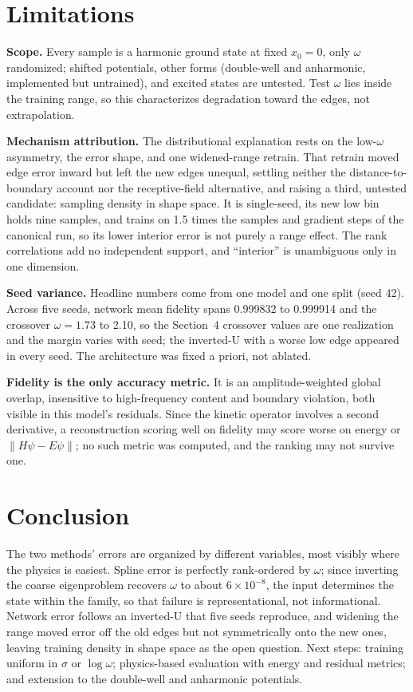 \documentclass{article}
\begin{document}
\section{Limitations}

\textbf{Scope.} Every sample is a harmonic ground state at fixed $x_{0} = 0$,
only $\omega$ randomized; shifted potentials, other forms (double-well and
anharmonic, implemented but untrained), and excited states are untested. Test
$\omega$ lies inside the training range, so this characterizes degradation
toward the edges, not extrapolation.

\textbf{Mechanism attribution.} The distributional explanation rests on the
low-$\omega$ asymmetry, the error shape, and one widened-range retrain. That
retrain moved edge error inward but left the new edges unequal, settling neither
the distance-to-boundary account nor the receptive-field alternative, and raising
a third, untested candidate: sampling density in shape space. It is
single-seed, its new low bin holds nine samples, and trains on 1.5 times the
samples and gradient steps of the canonical run, so its lower interior error is
not purely a range effect. The rank correlations add no independent support, and
``interior'' is unambiguous only in one dimension.

\textbf{Seed variance.} Headline numbers come from one model and one split (seed
42). Across five seeds, network mean fidelity spans 0.999832 to 0.999914 and the
crossover $\omega = 1.73$ to 2.10, so the Section~4 crossover values are one
realization and the margin varies with seed; the inverted-U with a worse low edge
appeared in every seed. The architecture was fixed a priori, not ablated.

\textbf{Fidelity is the only accuracy metric.} It is an amplitude-weighted global
overlap, insensitive to high-frequency content and boundary violation, both
visible in this model's residuals. Since the kinetic operator involves a second
derivative, a reconstruction scoring well on fidelity may score worse on energy
or $\lVert H\psi - E\psi \rVert$; no such metric was computed, and the ranking
may not survive one.

\section{Conclusion}

The two methods' errors are organized by different variables, most visibly where
the physics is easiest. Spline error is perfectly rank-ordered by $\omega$; since
inverting the coarse eigenproblem recovers $\omega$ to about $6 \times 10^{-8}$, the
input determines the state within the family, so that failure is
representational, not informational. Network error follows an inverted-U that
five seeds reproduce, and widening the range moved error off the old edges but
not symmetrically onto the new ones, leaving training density in shape space as
the open question. Next steps: training uniform in $\sigma$ or $\log\omega$;
physics-based evaluation with energy and residual metrics; and extension to the
double-well and anharmonic potentials.
\end{document}
